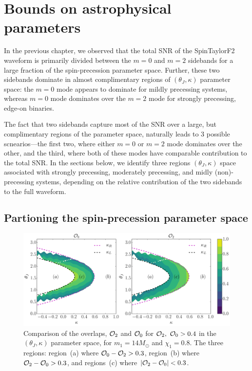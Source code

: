 
\chapter{Bounds on astrophysical parameters}

In the previous chapter, we observed that the total SNR of the SpinTaylorF2
waveform is primarily divided between the $m=0$ and $m=2$ sidebands for a
large fraction of the spin-precession parameter space. Further, these two
sidebands dominate in almost complimentary regions of $(\theta_J, \kappa)$
parameter space: the $m=0$ mode appears to dominate for mildly precessing
systems, whereas $m=0$ mode dominates over the $m=2$ mode for strongly
precessing, edge-on binaries.

The fact that two sidebands capture most of the SNR over a large, but
complimentary regions of the parameter space, naturally leads to 3 possible
scnearios---the first two, where either $m=0$ or $m=2$ mode dominates over the
other, and the third, where both of these modes have comparable contribution
to the total SNR. In the sections below, we identify three regions $(\theta_J,
\kappa)$ space associated with strongly precessing, moderately precessing, and
midly (non)-precessing systems, depending on the relative contribution of the
two sidebands to the full waveform.

\section{Partioning the spin-precession parameter space}

\begin{figure}[!tp]
\centering
\includegraphics[width=0.8\linewidth]{images/OVLP_cut.pdf}
\caption{\small{Comparison of the overlaps, ${\cal{O}}_2$ and ${\cal{O}}_0$
for ${\cal{O}}_2, ~{\cal{O}}_0 > 0.4$ in the $(\theta_J, \kappa)$ parameter
space, for $m_{1}=14M_{\odot}$ and $\chi_1=0.8$. The three regions: region~(a)
where ${\cal{O}}_0 - {\cal{O}}_2 > 0.3$, region~(b) where ${\cal{O}}_2 -
{\cal{O}}_0 > 0.3$, and regions~(c) where $|{\cal{O}}_2-{\cal{O}}_0|< 0.3$.}}
\label{FIG:OVLP_cut_regions}
\end{figure}

